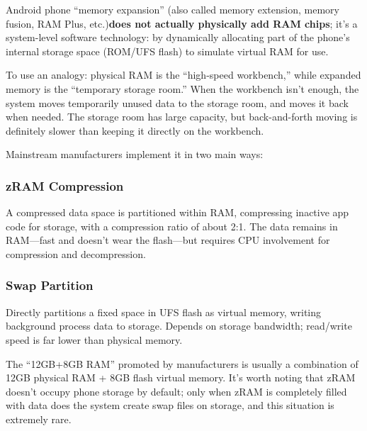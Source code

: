 


Android phone “memory expansion” (also called memory extension, memory fusion, RAM Plus, etc.)\textbf{does not actually physically add RAM chips}; it's a system-level software technology: by dynamically allocating part of the phone's internal storage space (ROM/UFS flash) to simulate virtual RAM for use.

To use an analogy: physical RAM is the “high-speed workbench,” while expanded memory is the “temporary storage room.” When the workbench isn't enough, the system moves temporarily unused data to the storage room, and moves it back when needed. The storage room has large capacity, but back-and-forth moving is definitely slower than keeping it directly on the workbench.


Mainstream manufacturers implement it in two main ways:

\subsubsection*{zRAM Compression}

A compressed data space is partitioned within RAM, compressing inactive app code for storage, with a compression ratio of about 2:1. The data remains in RAM—fast and doesn't wear the flash—but requires CPU involvement for compression and decompression.

\subsubsection*{Swap Partition}

Directly partitions a fixed space in UFS flash as virtual memory, writing background process data to storage. Depends on storage bandwidth; read/write speed is far lower than physical memory.

The “12GB+8GB RAM” promoted by manufacturers is usually a combination of 12GB physical RAM + 8GB flash virtual memory. It's worth noting that zRAM doesn't occupy phone storage by default; only when zRAM is completely filled with data does the system create swap files on storage, and this situation is extremely rare.

